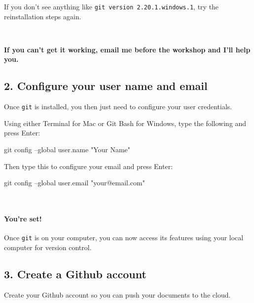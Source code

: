 \documentclass[10,portrait]{article}
\newenvironment{Shaded}{\begin{snugshade}}{\end{snugshade}}
\newcommand{\StringTok}[1]{\textcolor[rgb]{0.31,0.60,0.02}{#1}}
\newcommand{\FunctionTok}[1]{\textcolor[rgb]{0.00,0.00,0.00}{#1}}
\newcommand{\NormalTok}[1]{#1}
\let\oldparagraph\paragraph
\renewcommand{\paragraph}[1]{\oldparagraph{#1}\mbox{}}
\begin{document}
If you don't see anything like \texttt{git\ version\ 2.20.1.windows.1},
try the reinstallation steps again.

~ ~ ~

\textbf{If you can't get it working, email me before the workshop and
I'll help you.}

\newpage  

\subsection{2. Configure your user name and
email}\label{configure-your-user-name-and-email}

Once \texttt{git} is installed, you then just need to configure your
user credentials.

Using either Terminal for Mac or Git Bash for Windows, type the
following and press Enter:

\begin{Shaded}
\begin{Highlighting}[]

\FunctionTok{git}\NormalTok{ config --global user.name }\StringTok{"Your Name"} 
\end{Highlighting}
\end{Shaded}

Then type this to configure your email and press Enter:

\begin{Shaded}
\begin{Highlighting}[]

\FunctionTok{git}\NormalTok{ config --global user.email }\StringTok{"your@email.com"} 
\end{Highlighting}
\end{Shaded}

~ ~ ~

\paragraph{You're set!}\label{youre-set}

Once \texttt{git} is on your computer, you can now access its features
using your local computer for version control.

\newpage  

\subsection{3. Create a Github account}\label{create-a-github-account}

Create your Github account so you can push your documents to the cloud.
\end{document}

